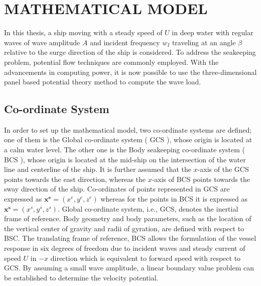 \chapter{MATHEMATICAL MODEL}
In this thesis, a ship moving with a steady speed of $U$ in deep water with regular 
waves of wave amplitude $A$ and incident frequency $w_I$ traveling at an angle 
$\beta$ relative to the surge direction of the ship is considered. To address the seakeeping
problem, potential flow techniques are commonly employed. With the advancements in computing power, 
it is now possible to use the three-dimensional panel based potential theory method to compute 
the wave load.

\section{Co-ordinate System}

In order to set up the mathematical model, two co-ordinate systems are defined; one of them is the 
Global co-ordinate system ( GCS ), whose origin is located at a calm water level. The other one is 
the Body seakeeping co-ordinate system ( BCS ), whose origin is located at the mid-ship on the 
intersection of the water line and centerline of the ship. It is further assumed that the $x$-axis 
of the GCS points towards the east direction, whereas the $x$-axis of BCS points towards the sway 
direction of the ship. Co-ordinates of points represented in GCS are expressed as 
$\boldsymbol{x^e} = (x^e, y^e, z^e)$ whereas for the points in BCS it is expressed as 
$\boldsymbol{x^s} = (x^s, y^s, z^s)$. Global co-ordinate system, i.e., GCS, 
denotes the inertial frame of reference. Body geometry and body parameters, 
such as the location of the vertical center of gravity and radii of gyration, 
are defined with respect to BSC.
The translating frame of reference, BCS allows the formulation of the vessel response in 
six degrees of freedom due to incident waves and steady current of speed $U$ in $-x$ direction 
which is equivalent to forward speed with respect to GCS. By assuming a small wave amplitude, 
a linear boundary value problem can be established to determine the velocity potential.
